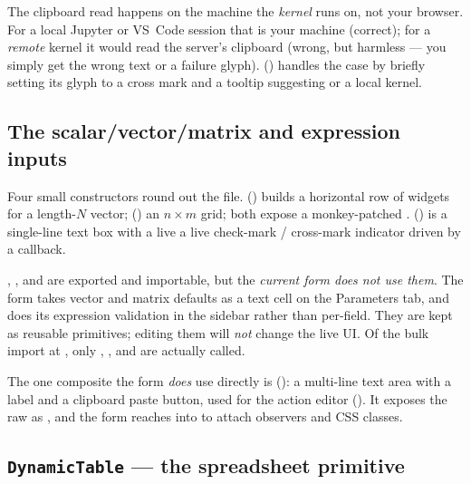 \begin{gotcha}
The clipboard read happens on the machine the \emph{kernel} runs on, not your
browser. For a local Jupyter or VS~Code session that is your machine (correct);
for a \emph{remote} kernel it would read the server's clipboard (wrong, but
harmless --- you simply get the wrong text or a failure glyph). 
() handles the  case by briefly setting
its glyph to a cross mark and a tooltip suggesting  or
a local kernel.
\end{gotcha}

\subsection{The scalar/vector/matrix and expression inputs}

Four small constructors round out the file. 
() builds a horizontal row of 
widgets for a length-$N$ vector; 
() an $n\times m$ grid; both expose a
monkey-patched . 
() is a single-line text box with a live
a live check-mark / cross-mark indicator driven by a 
callback.

\begin{gotcha}
, , and  are
exported and importable, but the \emph{current form does not use them}. The form
takes vector and matrix defaults as a text cell on the Parameters tab, and does
its expression validation in the sidebar rather than per-field. They are kept as
reusable primitives; editing them will \emph{not} change the live UI. Of the bulk
import at , only ,
, and  are actually called.
\end{gotcha}

The one composite the form \emph{does} use directly is 
(): a multi-line text area with a label and a
clipboard paste button, used for the action editor ().
It exposes the raw  as , and the form reaches
into  to attach observers and CSS classes.

\subsection{\texttt{DynamicTable} --- the spreadsheet primitive}

